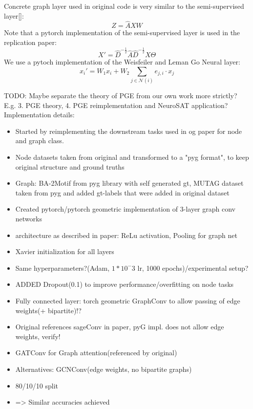 Concrete graph layer used in original code is very similar to the semi-supervised layer\ref{}:
\begin{equation}
    Z = \hat{A}XW
\end{equation}
Note that a pytorch implementation of the semi-supervised layer is used in the replication paper:
\begin{equation}
    X' = \hat{D}^{-\frac{1}{2}}\hat{A}\hat{D}^{-\frac{1}{2}}X\Theta
\end{equation}
We use a pytoch implementation of the Weisfeiler and Leman Go Neural layer:
\begin{equation}
    x_i' = W_1x_i+W_2 \sum_{j\in\mathcal{N}(i)}e_{j,i}\cdot x_j
\end{equation}

TODO: Maybe separate the theory of PGE from our own work more strictly? E.g. 3. PGE theory, 4. PGE reimplementation and NeuroSAT application? \\
Implementation details:
\begin{itemize}
    \item Started by reimplementing the downstream tasks used in og paper for node and graph class.
    \item Node datasets taken from original and transformed to a "pyg format", to keep original structure and ground truths
    \item Graph: BA-2Motif from pyg library with self generated gt, MUTAG dataset taken from pyg and added gt-labels that were added in original dataset
    \item Created pytorch/pytorch geometric implementation of 3-layer graph conv networks
    \item architecture as described in paper: ReLu activation, Pooling for graph net
    \item Xavier initialization for all layers
    \item Same hyperparameters?(Adam, $1*10^-3$ lr, 1000 epochs)/experimental setup?
    \item ADDED Dropout(0.1) to improve performance/overfitting on node tasks
    \item Fully connected layer: torch geometric GraphConv to allow passing of edge weights(+ bipartite)!?
    \item Original references sageConv in paper, pyG impl. does not allow edge weights, verify!
    \item GATConv for Graph attention(referenced by original)
    \item Alternatives: GCNConv(edge weights, no bipartite graphs)
    \item 80/10/10 split
    \item => Similar accuracies achieved
\end{itemize}
 

